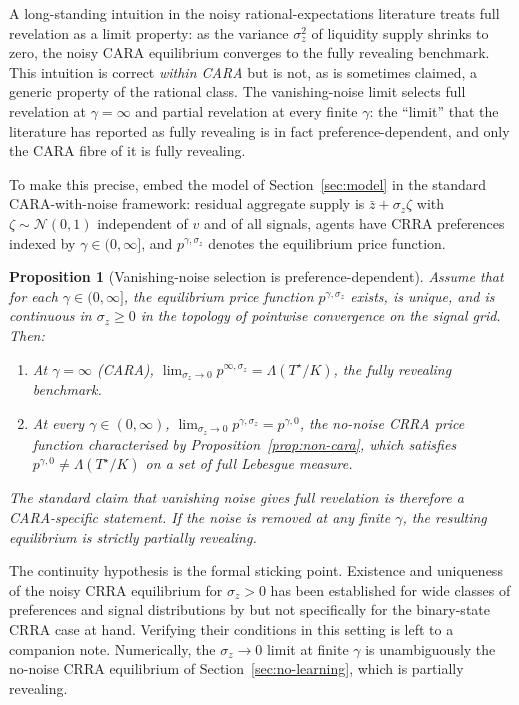 \documentclass[12pt,letterpaper]{article}
\newtheorem{proposition}{Proposition}
\theoremstyle{definition}
\theoremstyle{remark}
\newcommand{\Lam}{\Lambda}            %
\newcommand{\Tstar}{T^{\!\star}}
\newcommand{\1}{\mathbf{1}}
\begin{document}
A long-standing intuition in the noisy rational-expectations literature
treats full revelation as a limit property: as the variance $\sigma_{z}^{2}$
of liquidity supply shrinks to zero, the noisy CARA equilibrium converges
to the fully revealing benchmark. This intuition is correct \emph{within
CARA} but is not, as is sometimes claimed, a generic property of the
rational class. The vanishing-noise limit selects full revelation at
$\gamma=\infty$ and partial revelation at every finite $\gamma$: the
``limit'' that the literature has reported as fully revealing is in fact
preference-dependent, and only the CARA fibre of it is fully revealing.

To make this precise, embed the model of Section~\ref{sec:model} in the
standard CARA-with-noise framework: residual aggregate supply is
$\bar z + \sigma_{z}\zeta$ with $\zeta\sim\mathcal{N}(0,1)$ independent
of $v$ and of all signals, agents have CRRA preferences indexed by
$\gamma\in(0,\infty]$, and $p^{\gamma,\sigma_{z}}$ denotes the equilibrium
price function.

\begin{proposition}[Vanishing-noise selection is preference-dependent]\label{prop:vanishing}
Assume that for each $\gamma\in(0,\infty]$, the equilibrium price function
$p^{\gamma,\sigma_{z}}$ exists, is unique, and is continuous in
$\sigma_{z}\geq 0$ in the topology of pointwise convergence on the signal
grid. Then:
\begin{enumerate}[label=\textnormal{(\roman*)},topsep=2pt,itemsep=2pt]
\item At $\gamma=\infty$ (CARA),
$\lim_{\sigma_{z}\to 0}p^{\infty,\sigma_{z}}=\Lam(\Tstar/K)$, the fully
revealing benchmark.
\item At every $\gamma\in(0,\infty)$,
$\lim_{\sigma_{z}\to 0}p^{\gamma,\sigma_{z}}=p^{\gamma,0}$, the no-noise
CRRA price function characterised by Proposition~\ref{prop:non-cara},
which satisfies $p^{\gamma,0}\neq\Lam(\Tstar/K)$ on a set of full
Lebesgue measure.
\end{enumerate}
The standard claim that vanishing noise gives full revelation is therefore
a CARA-specific statement. If the noise is removed at any finite
$\gamma$, the resulting equilibrium is strictly partially revealing.
\end{proposition}

The continuity hypothesis is the formal sticking point. Existence
and uniqueness of the noisy CRRA equilibrium for $\sigma_{z}>0$ has been
established for wide classes of preferences and signal distributions by
\citet{BreonDrish2015} but not specifically for the binary-state CRRA
case at hand. Verifying their conditions in this setting is left to a
companion note. Numerically, the $\sigma_{z}\to 0$ limit at finite
$\gamma$ is unambiguously the no-noise CRRA equilibrium of
Section~\ref{sec:no-learning}, which is partially revealing.
\end{document}
